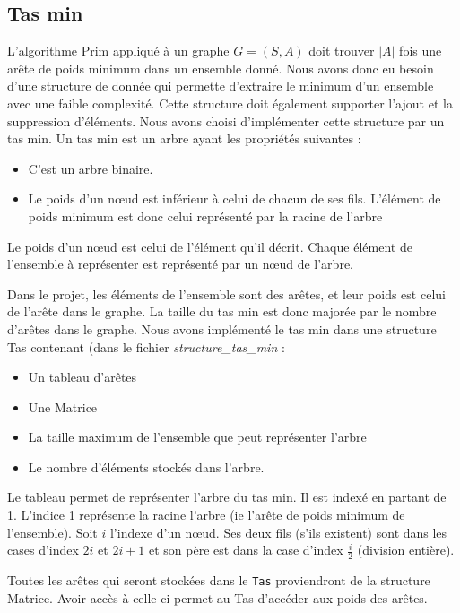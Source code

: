 \documentclass[a4paper,11pt]{article}
\begin{document}
\subsection{Tas min} %
L'algorithme Prim appliqué à un graphe $G = (S, A)$ doit trouver $|A|$ fois une arête de poids minimum dans un ensemble donné.
Nous avons donc eu besoin d'une structure de donnée qui permette d'extraire le minimum d'un ensemble avec une faible complexité. Cette structure doit également supporter l'ajout et la suppression d'éléments.
Nous avons choisi d'implémenter cette structure par un tas min.
Un tas min est un arbre ayant les propriétés suivantes :
\begin{itemize}
\item C'est un arbre binaire.
\item Le poids d'un nœud est inférieur à celui de chacun de ses fils. L'élément de poids minimum est donc celui représenté par la racine de l'arbre
\end{itemize}
Le poids d'un nœud est celui de l'élément qu'il décrit.
Chaque élément de l'ensemble à représenter est représenté par un nœud de l'arbre.

Dans le projet, les éléments de l'ensemble sont des arêtes, et leur poids est celui de l'arête dans le graphe. La taille du tas min est donc majorée par le nombre d'arêtes dans le graphe.
Nous avons implémenté le tas min dans une structure \textsf{Tas} contenant (dans le fichier \emph{structure\_tas\_min} :
\begin{itemize}
\renewcommand{\FrenchLabelItem}{\textbullet}
\item Un tableau d’arêtes
\item Une \textsf{Matrice}
\item La taille maximum de l'ensemble que peut représenter l'arbre
\item Le nombre d'éléments stockés dans l'arbre.
\end{itemize}
Le tableau permet de représenter l'arbre du tas min. Il est indexé en partant de 1.
L'indice 1 représente la racine l'arbre (ie l'arête de poids minimum de l'ensemble).
Soit $i$ l'indexe d'un nœud. Ses deux fils (s'ils existent) sont dans les cases d'index $2i$ et $2i +1$ et son père est dans la case d'index $\frac{i}{2}$ (division entière).

Toutes les arêtes qui seront stockées dans le \texttt{Tas} proviendront de la structure \textsf{Matrice}. Avoir accès à celle ci permet au \textsf{Tas} d'accéder aux poids des arêtes.
\end{document}
